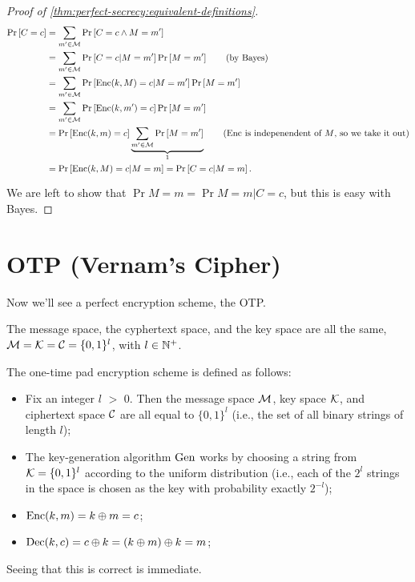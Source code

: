 \begin{proof}[Proof of \cref{thm:perfect-secrecy:equivalent-definitions}]
	\begin{align*}
		\Pr{C = c}
		& =
		\sum_{m' \in \M} \Pr{C = c \land M = m'}
		\\
		& = 
		\sum_{m' \in \M} \Pr{C = c | M = m'} \Pr{M = m'}
		\tag{by Bayes}
		\\
		& =
		\sum_{m' \in \M} \Pr{\GenericEnc(k,M) = c | M = m'} \Pr{M = m'}
		\\
		& =
		\sum_{m' \in \M} \Pr{\GenericEnc(k,m') = c} \Pr{M = m'}
		\\
		& =
		\Pr{\GenericEnc(k, m) = c} \underbrace{\sum_{m' \in \M} \Pr{M = m'}}_{1}
		\tag{$\GenericEnc$ is indepenendent of $M$, so we take it out}
		\\
		& =
		\Pr{\GenericEnc(k,M) = c | M = m} =
		\Pr{C = c | M = m}.
	\end{align*}
	We are left to show that $\Pr{M = m} = \Pr{M = m | C = c}$, but this is easy with Bayes.
\end{proof}

\section{\acl{OTP} (Vernam's Cipher)}

Now we'll see a perfect encryption scheme, the \ac{OTP}.

\begin{construction}
	The message space, the cyphertext space, and the key space are all the same, \ie $\mathcal{M} = \mathcal{K} = \mathcal{C} = \{0,1\}^{l}$, with $l \in \mathbb{N}^{+}$.

	The one-time pad encryption scheme is defined as follows:
	
	\begin{itemize}
		\item Fix an integer $l$ $>$ 0. Then the message space $\mathcal{M}$, key space $\mathcal{K}$, and ciphertext space $\mathcal{C}$ are all equal to $\{0, 1\}^l$ (i.e., the set of all binary strings of length $l$);
		\item The key-generation algorithm $\mathrm{Gen}$ works by choosing a string from $\mathcal{K} = \{0, 1\}^l$ according to the uniform distribution (i.e., each of the $2^l$ strings in the space is chosen as the key with probability exactly $2^{-l}$);
		\item $\mathrm{Enc}(k,m) = k \oplus m = c$;
		\item $\mathrm{Dec}(k,c) = c \oplus k = (k \oplus m) \oplus k = m$;
	\end{itemize}
\end{construction}
Seeing that this is correct is immediate.

